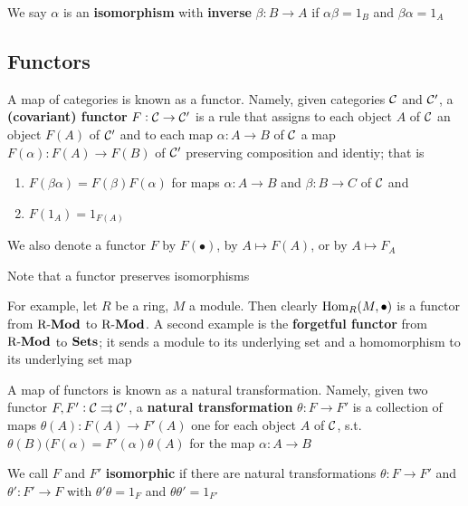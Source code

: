 \documentclass[11pt]{article}
\begin{document}
We say \(\alpha\) is an \textbf{isomorphism} with \textbf{inverse} \(\beta:B\to A\) if \(\alpha\beta=1_B\)
and \(\beta\alpha=1_A\)
\subsection*{Functors \label{6.2}}
\label{sec:org1912260}
A map of categories is known as a functor. Namely, given categories \(\mathcal{C}\)
and \(\mathcal{C}'\), a \textbf{(covariant) functor} \(F:\mathcal{C}\to\mathcal{C}'\) is a rule that
assigns to each object \(A\) of \(\mathcal{C}\) an object \(F(A)\) of \(\mathcal{C}'\)
and to each map \(\alpha:A\to B\) of \(\mathcal{C}\) a map \(F(\alpha):F(A)\to F(B)\) of
\(\mathcal{C}'\) preserving composition and identiy; that is
\begin{enumerate}
\item \(F(\beta\alpha)=F(\beta)F(\alpha)\) for maps \(\alpha:A\to B\) and \(\beta:B\to C\) of
\(\mathcal{C}\) and
\item \(F(1_A)=1_{F(A)}\)
\end{enumerate}


We also denote a functor \(F\) by \(F(\bullet)\), by \(A\mapsto F(A)\), or by
\(A\mapsto F_A\)

Note that a functor preserves isomorphisms

For example, let \(R\) be a ring, \(M\) a module. Then clearly
\(\operatorname{Hom}_R(M,\bullet)\) is a functor from \(\operatorname{R-\textbf{Mod}}\) to \(\operatorname{R-\textbf{Mod}}\). A
second example is the \textbf{forgetful functor} from \(\operatorname{R-\textbf{Mod}}\) to \(\operatorname{\textbf{Sets}}\); it sends
a module to its underlying set and a homomorphism to its underlying set map

A map of functors is known as a natural transformation. Namely, given two
functor \(F,F':\mathcal{C}\rightrightarrows\mathcal{C}'\), a \textbf{natural transformation}
\(\theta:F\to F'\) is a collection of maps \(\theta(A):F(A)\to F'(A)\) one for each
object \(A\) of \(\mathcal{C}\), s.t. \(\theta(B)(F(\alpha)=F'(\alpha)\theta(A)\) for the map \(\alpha:A\to B\)
\begin{center}
\end{center}

We call \(F\) and \(F'\) \textbf{isomorphic} if there are natural transformations
\(\theta:F\to F'\) and \(\theta':F'\to F\) with \(\theta'\theta=1_F\) and \(\theta\theta'=1_{F'}\)
\end{document}
